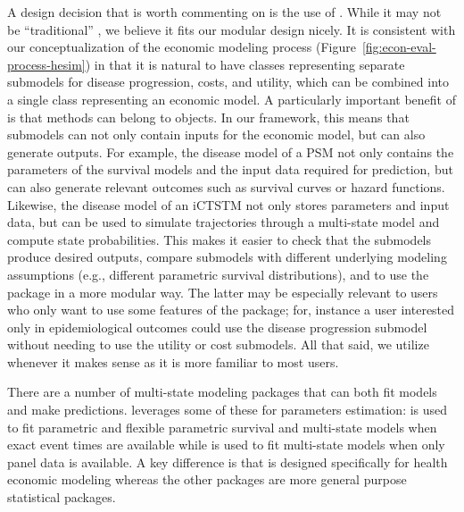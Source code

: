 \documentclass[article, nojss]{jss}\usepackage[]{graphicx}\usepackage[]{color}
\begin{document}
A design decision that is worth commenting on is the use of . While it may not be ``traditional'' , we believe it fits our modular design nicely. It is consistent with our conceptualization of the economic modeling process (Figure~\ref{fig:econ-eval-process-hesim}) in that it is natural to have classes representing separate submodels for disease progression, costs, and utility, which can be combined into a single class representing an economic model. A particularly important benefit of  is that methods can belong to objects. In our framework, this means that submodels can not only contain inputs for the economic model, but can also generate outputs. For example, the disease model of a PSM not only contains the parameters of the survival models and the input data required for prediction, but can also generate relevant outcomes such as survival curves or hazard functions. Likewise, the disease model of an iCTSTM not only stores parameters and input data, but can be used to simulate trajectories through a multi-state model and compute state probabilities. This makes it easier to check that the submodels produce desired outputs, compare submodels with different underlying modeling assumptions (e.g., different parametric survival distributions), and to use the package in a more modular way. The latter may be especially relevant to users who only want to use some features of the package; for, instance a user interested only in epidemiological outcomes could use the disease progression submodel without needing to use the utility or cost submodels. All that said, we utilize  whenever it makes sense as it is more familiar to most  users.

There are a number of multi-state modeling  packages that can both fit models and make predictions.  leverages some of these for parameters estimation:  is used to fit parametric and flexible parametric survival and multi-state models when exact event times are available while  is used to fit multi-state models when only panel data is available. A key difference is that  is designed specifically for health economic modeling whereas the other packages are more general purpose statistical packages. 
\end{document}
